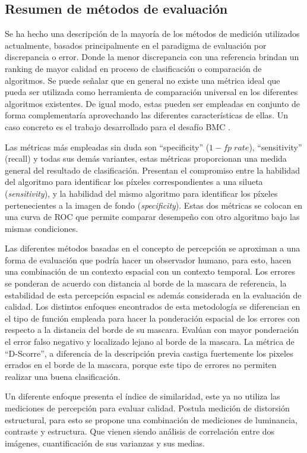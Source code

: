 \subsection{Resumen de métodos de evaluación}
Se ha hecho una descripción de la mayoría de los métodos de medición utilizados actualmente, basados principalmente en el paradigma de evaluación por discrepancia  o error. Donde la menor discrepancia con una referencia brindan un ranking de mayor calidad en proceso de clasificación o comparación de algoritmos. Se puede señalar que en general no existe una métrica ideal que pueda ser utilizada como herramienta de comparación universal en los diferentes algoritmos existentes. De igual modo, estas pueden ser empleadas en conjunto de forma complementaría aprovechando las diferentes características de ellas. Un caso concreto es el trabajo desarrollado para el desafío BMC \cite{park_benchmark_2013}.

Las métricas más empleadas sin duda son ``specificity'' ($1-fp\; rate$), ``sensitivity'' (recall) y todas sus demás variantes, estas métricas proporcionan una medida general del resultado de clasificación. Presentan el compromiso entre la habilidad del algoritmo para identificar los píxeles correspondientes a una silueta (\emph{sensitivity}), y la habilidad del mismo algoritmo para identificar los píxeles pertenecientes a la imagen de fondo (\emph{specificity}). Estas dos métricas se colocan en una curva de ROC que permite comparar desempeño con otro algoritmo bajo las mismas condiciones. 

Las diferentes métodos basadas en el concepto de percepción se aproximan a una forma de evaluación que podría hacer un observador humano, para esto, hacen una combinación de un contexto espacial con un contexto temporal. Los errores se ponderan de acuerdo con distancia al borde de la mascara de referencia, la estabilidad de esta percepción espacial es además considerada en la evaluación de calidad. Los distintos enfoques encontrados de esta metodología se diferencian en el tipo de función empleada para hacer la ponderación espacial de los errores con respecto a la distancia del borde de su mascara. Evalúan con mayor ponderación el error falso negativo y localizado lejano al borde de la mascara. La métrica de ``D-Scorre'', a diferencia de la descripción previa castiga fuertemente los pixeles errados en el borde de la mascara, porque este tipo de errores no permiten realizar una buena clasificación.

Un diferente enfoque presenta el índice de similaridad, este ya no utiliza las mediciones de percepción para evaluar calidad. Postula medición de distorsión estructural, para esto se propone una combinación de mediciones de luminancia, contraste y estructura. Que vienen siendo análisis de correlación entre dos imágenes, cuantificación de sus varianzas y sus medias. 

